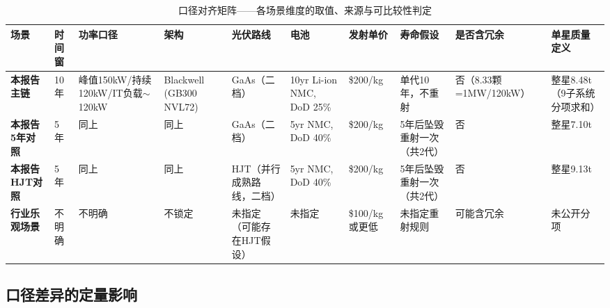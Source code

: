 \begin{table}[H]
  \centering
  \caption{口径对齐矩阵——各场景维度的取值、来源与可比较性判定}
  \label{tab:alignment-matrix}
  \small
  \begin{tabular}{
    >{\raggedright\arraybackslash}p{1.6cm}
    >{\raggedright\arraybackslash}p{1.2cm}
    >{\raggedright\arraybackslash}p{1.1cm}
    >{\raggedright\arraybackslash}p{1.0cm}
    >{\raggedright\arraybackslash}p{0.9cm}
    >{\raggedright\arraybackslash}p{0.9cm}
    >{\raggedright\arraybackslash}p{0.8cm}
    >{\raggedright\arraybackslash}p{0.9cm}
    >{\raggedright\arraybackslash}p{1.0cm}
    >{\raggedright\arraybackslash}p{1.0cm}
  }
  \toprule
  \textbf{场景} & \textbf{时间窗} & \textbf{功率口径} & \textbf{架构} & \textbf{光伏路线} & \textbf{电池} & \textbf{发射单价} & \textbf{寿命假设} & \textbf{是否含冗余} & \textbf{单星质量定义} \\
  \midrule
  \textbf{本报告主链} & 10年 & 峰值150kW/持续120kW/IT负载$\sim$120kW & Blackwell (GB300 NVL72) & GaAs（二档） & 10yr Li-ion NMC, DoD 25\% & \$200/kg & 单代10年，不重射 & 否（8.33颗=1MW/120kW） & 整星8.48t（9子系统分项求和） \\[3pt]
  \textbf{本报告5年对照} & 5年 & 同上 & 同上 & GaAs（二档） & 5yr NMC, DoD 40\% & \$200/kg & 5年后坠毁重射一次（共2代） & 否 & 整星7.10t \\[3pt]
  \textbf{本报告HJT对照} & 5年 & 同上 & 同上 & HJT（并行成熟路线，二档） & 5yr NMC, DoD 40\% & \$200/kg & 5年后坠毁重射一次（共2代） & 否 & 整星9.13t \\[3pt]
  \textbf{行业乐观场景} & 不明确 & 不明确 & 不锁定 & 未指定（可能存在HJT假设） & 未指定 & \$100/kg或更低 & 未指定重射规则 & 可能含冗余 & 未公开分项 \\
  \bottomrule
  \end{tabular}
\end{table}

\subsection{口径差异的定量影响}

